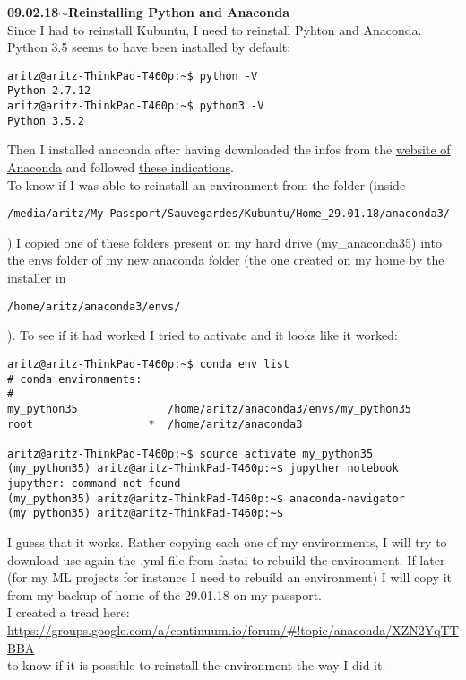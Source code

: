 \documentclass[11pt,a4paper]{article}
\newenvironment{loggentry}[2]%
{\noindent\textbf{#1}\hspace{1cm}$\mathbf{\sim}$\text{ }\textbf{#2}\\}{\vspace{0.5cm}}
\begin{document}
\begin{loggentry}{09.02.18}{Reinstalling Python and Anaconda}
Since I had to reinstall Kubuntu, I need to reinstall Pyhton and Anaconda. Python 3.5 seems to have been installed by default:\\
\begin{verbatim}
aritz@aritz-ThinkPad-T460p:~$ python -V
Python 2.7.12
aritz@aritz-ThinkPad-T460p:~$ python3 -V
Python 3.5.2
\end{verbatim}
Then I installed anaconda after having downloaded the infos from the \href{https://www.anaconda.com/download/#download}{website of Anaconda} and followed \href{https://docs.anaconda.com/anaconda/install/linux}{these indications}.\\
To know if I was able to reinstall an environment from the folder (inside 
\begin{verbatim}
/media/aritz/My Passport/Sauvegardes/Kubuntu/Home_29.01.18/anaconda3/
\end{verbatim}
) I copied one of these folders present on my hard drive (my\_anaconda35) into the envs folder of my new anaconda folder (the one created on my home by the installer in
\begin{verbatim}
/home/aritz/anaconda3/envs/
\end{verbatim}
). To see if it had worked I tried to activate and it looks like it worked:
\begin{verbatim}
aritz@aritz-ThinkPad-T460p:~$ conda env list
# conda environments:
#
my_python35              /home/aritz/anaconda3/envs/my_python35
root                  *  /home/aritz/anaconda3

aritz@aritz-ThinkPad-T460p:~$ source activate my_python35
(my_python35) aritz@aritz-ThinkPad-T460p:~$ jupyther notebook
jupyther: command not found
(my_python35) aritz@aritz-ThinkPad-T460p:~$ anaconda-navigator
(my_python35) aritz@aritz-ThinkPad-T460p:~$ 
\end{verbatim}
I guess that it works. Rather copying each one of my environments, I will try to download use again the .yml file from fastai to rebuild the environment. If later (for my ML projects for instance I need to rebuild an environment) I will copy it from my backup of home of the 29.01.18 on my passport.\\
I created a tread here:\\
\url{https://groups.google.com/a/continuum.io/forum/#!topic/anaconda/XZN2YqTTBBA}\\
to know if it is possible to reinstall the environment the way I did it.
\end{loggentry}
\end{document}
